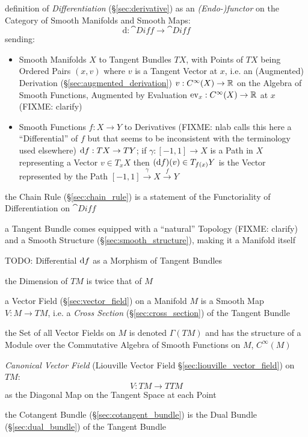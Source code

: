 definition of \emph{Differentiation} (\S\ref{sec:derivative}) as an
\emph{(Endo-)functor} on the Category of Smooth Manifolds and Smooth Maps:
\[
  \mathrm{d} : \cat{Diff} \rightarrow \cat{Diff}
\]
sending:
\begin{itemize}
  \item Smooth Manifolds $X$ to Tangent Bundles $T X$, with Points of $T X$
    being Ordered Pairs $(x, v)$ where $v$ is a Tangent Vector at $x$, i.e. an
    (Augmented) Derivation (\S\ref{sec:augmented_derivation}) $v : C^\infty(X)
    \rightarrow \mathbb{R}$ on the Algebra of Smooth Functions, Augmented by
    Evaluation $\mathrm{ev}_x : C^\infty(X) \rightarrow \mathbb{R}$ at $x$
    (FIXME: clarify)
  \item Smooth Functions $f : X \rightarrow Y$ to Derivatives (FIXME: nlab calls
    this here a ``Differential'' of $f$ but that seems to be inconsistent with
    the terminology used elsewhere) $\mathrm{d}f : TX \rightarrow TY$; if $\gamma
    : [-1,1] \rightarrow X$ is a Path in $X$ representing a Vector
    $v \in T_x{X}$ then $(\mathrm{d}f)(v) \in T_{f(x)}Y$ is the Vector represented
    by the Path $[-1, 1] \xrightarrow{\gamma} X \xrightarrow{f} Y$
\end{itemize}

the Chain Rule (\S\ref{sec:chain_rule}) is a statement of the Functoriality of
Differentiation on $\cat{Diff}$

a Tangent Bundle comes equipped with a ``natural'' Topology (FIXME: clarify)
and a Smooth Structure (\S\ref{sec:smooth_structure}), making it a Manifold
itself

TODO: Differential $\mathrm{d}f$ as a Morphism of Tangent Bundles

the Dimension of $T M$ is twice that of $M$

a Vector Field (\S\ref{sec:vector_field}) on a Manifold $M$ is a Smooth Map $V
: M \rightarrow T M$, i.e. a \emph{Cross Section} (\S\ref{sec:cross_section})
of the Tangent Bundle

the Set of all Vector Fields on $M$ is denoted $\Gamma(TM)$ and has the
structure of a Module over the Commutative Algebra of Smooth Functions on $M$,
$C^\infty(M)$

\emph{Canonical Vector Field} (Liouville Vector Field
\S\ref{sec:liouville_vector_field}) on $TM$:
\[
  V : TM \rightarrow TTM
\]
as the Diagonal Map on the Tangent Space at each Point

the Cotangent Bundle (\S\ref{sec:cotangent_bundle}) is the Dual Bundle
(\S\ref{sec:dual_bundle}) of the Tangent Bundle

